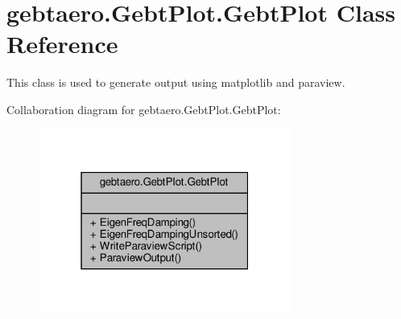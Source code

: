 \hypertarget{classgebtaero_1_1_gebt_plot_1_1_gebt_plot}{}\section{gebtaero.\+Gebt\+Plot.\+Gebt\+Plot Class Reference}
\label{classgebtaero_1_1_gebt_plot_1_1_gebt_plot}


This class is used to generate output using matplotlib and paraview.  




Collaboration diagram for gebtaero.\+Gebt\+Plot.\+Gebt\+Plot\+:\nopagebreak
\begin{figure}[H]
\begin{center}
\leavevmode
\includegraphics[width=235pt]{classgebtaero_1_1_gebt_plot_1_1_gebt_plot__coll__graph}
\end{center}
\end{figure}

